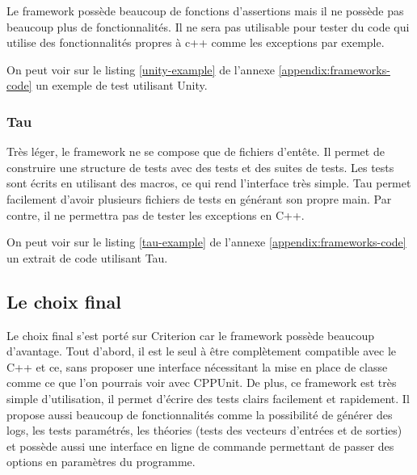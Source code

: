 \documentclass[a4paper]{article}
\begin{document}
Le framework possède beaucoup de fonctions d'assertions mais il ne possède pas
beaucoup plus de fonctionnalités. Il ne sera pas utilisable pour tester du code
qui utilise des fonctionnalités propres à c++ comme les exceptions par exemple.

On peut voir sur le listing \ref{unity-example} de l'annexe
\ref{appendix:frameworks-code} un exemple de test utilisant Unity.

\subsubsection*{Tau}

Très léger, le framework ne se compose que de fichiers d'entête. Il permet de
construire une structure de tests avec des tests et des suites de tests. Les
tests sont écrits en utilisant des macros, ce qui rend l'interface très simple.
Tau permet facilement d'avoir plusieurs fichiers de tests en générant son propre
main. Par contre, il ne permettra pas de tester les exceptions en C++.

On peut voir sur le listing \ref{tau-example} de l'annexe
\ref{appendix:frameworks-code} un extrait de code utilisant Tau.
\subsection{Le choix final}%

Le choix final s'est porté sur Criterion car le framework possède beaucoup
d'avantage. Tout d'abord, il est le seul à être complètement compatible avec le
C++ et ce, sans proposer une interface nécessitant la mise en place de classe
comme ce que l'on pourrais voir avec CPPUnit. De plus, ce framework est très
simple d'utilisation, il permet d'écrire des tests clairs facilement et
rapidement. Il propose aussi beaucoup de fonctionnalités comme la possibilité de
générer des logs, les tests paramétrés, les théories (tests des vecteurs
d'entrées et de sorties) et possède aussi une interface en ligne de commande
permettant de passer des options en paramètres du programme.
\end{document}

